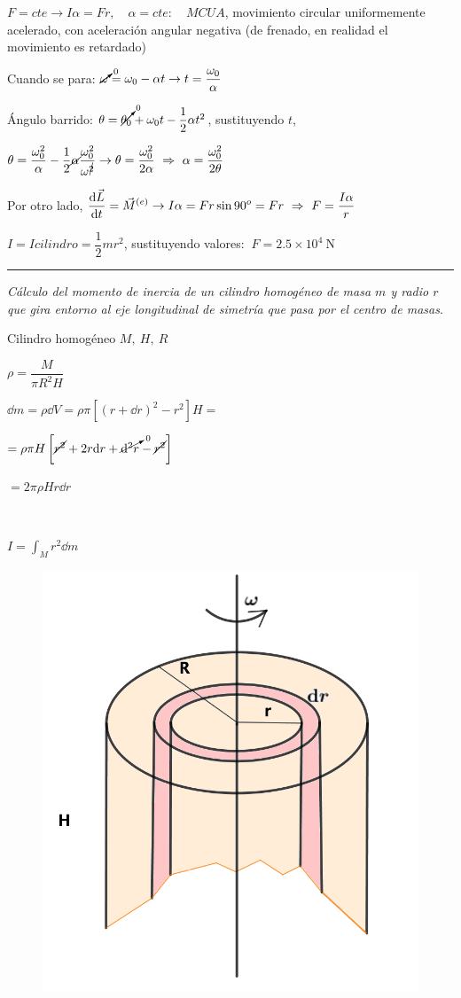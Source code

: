$F=cte \to I\alpha=Fr,\quad \alpha=cte:\quad MCUA$, movimiento circular uniformemente acelerado, con aceleración angular negativa (de frenado, en realidad el movimiento es retardado)

Cuando se para: $\cancelto{0}{\omega}=\omega_0-\alpha t \to t=\dfrac{\omega_0} {\alpha}$

Ángulo barrido: $\theta=\cancelto{0}{\theta_0}+\omega_0 t - \dfrac 1 2 \alpha t^2$, sustituyendo ${t}$,

$\theta = \dfrac {\omega_0^2}{\alpha}-\dfrac 1 2 \cancel{\alpha}\dfrac{\omega_0^2}{\omega^{\cancel{2}}} \to \theta=\dfrac{\omega_0^2}{2\alpha} \ \Rightarrow \ \alpha=\dfrac{\omega_0^2}{2\theta}$

Por otro lado, $\displaystyle \dv {\vec L}{t}=\vec M^{(e)} \to I\alpha=Fr\sin 90^o=Fr \ \Rightarrow \ F=\dfrac{I\alpha}{r}$

$I=I{cilindro}=\dfrac 1 2 m r^2$, sustituyendo valores: $\ F=2.5 \times 10^4\ \mathrm{N}$

\rule{5cm}{.4pt}

\emph{Cálculo del momento de inercia de un cilindro homogéneo de masa $m$ y radio $r$ que gira entorno al eje longitudinal de simetría que pasa por el centro de masas}.

\begin{multicols}{2}
Cilindro homogéneo $M,\ H,\ R$

$\rho=\dfrac{M}{\pi R^2 H}$

$\dd m= \rho \dd V =\rho  \pi \left[ (r+\dd r)^2-r^2 \right] H=$

$=\rho \pi H \left[\cancel{r^2}+2r\dd r +\cancelto{0}{\dd^2 r}-\cancel{r^2} \right]$

$=2\pi \rho H r \dd r$

$\quad$

$I=\displaystyle \int_M r^2 \dd m$
\begin{figure}[H]
	\centering
	\includegraphics[width=.45\textwidth]{imagenes/imagenes16/T16IM22.png}
\end{figure}	
\end{multicols}

